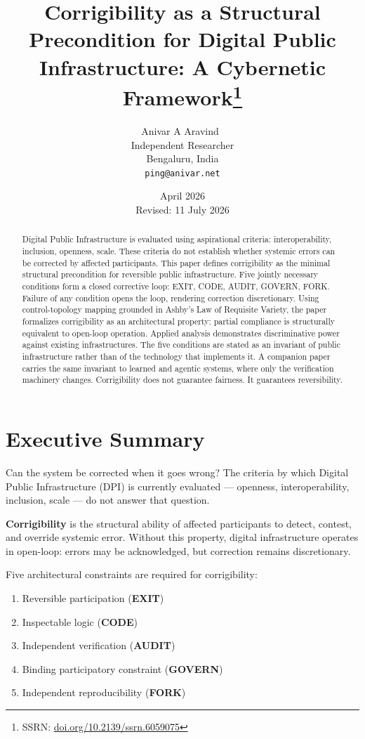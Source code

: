 \documentclass{article}
\title{Corrigibility as a Structural Precondition for Digital Public Infrastructure: A Cybernetic Framework\thanks{SSRN: \href{https://doi.org/10.2139/ssrn.6059075}{doi.org/10.2139/ssrn.6059075}}}
\author{
  Anivar A Aravind~\orcidlink{0009-0009-8995-0005} \\
  Independent Researcher\\
  Bengaluru, India \\
  \texttt{ping@anivar.net}
}
\date{April 2026 \\ {\small Revised: 11 July 2026}}
\begin{document}
\maketitle

\begin{abstract}
Digital Public Infrastructure is evaluated using aspirational criteria: interoperability, inclusion, openness, scale. These criteria do not establish whether systemic errors can be corrected by affected participants. This paper defines corrigibility as the minimal structural precondition for reversible public infrastructure. Five jointly necessary conditions form a closed corrective loop: EXIT, CODE, AUDIT, GOVERN, FORK. Failure of any condition opens the loop, rendering correction discretionary. Using control-topology mapping grounded in Ashby's Law of Requisite Variety, the paper formalizes corrigibility as an architectural property: partial compliance is structurally equivalent to open-loop operation. Applied analysis demonstrates discriminative power against existing infrastructures. The five conditions are stated as an invariant of public infrastructure rather than of the technology that implements it. A companion paper carries the same invariant to learned and agentic systems, where only the verification machinery changes. Corrigibility does not guarantee fairness. It guarantees reversibility.
\end{abstract}


\section*{Executive Summary}

Can the system be corrected when it goes wrong? The criteria by which Digital Public Infrastructure (DPI) is currently evaluated --- openness, interoperability, inclusion, scale --- do not answer that question.

\textbf{Corrigibility} is the structural ability of affected participants to detect, contest, and override systemic error. Without this property, digital infrastructure operates in open-loop: errors may be acknowledged, but correction remains discretionary.

Five architectural constraints are required for corrigibility:

\begin{enumerate}[noitemsep]
    \item Reversible participation (\textbf{EXIT})
    \item Inspectable logic (\textbf{CODE})
    \item Independent verification (\textbf{AUDIT})
    \item Binding participatory constraint (\textbf{GOVERN})
    \item Independent reproducibility (\textbf{FORK})
\end{enumerate}
\end{document}

